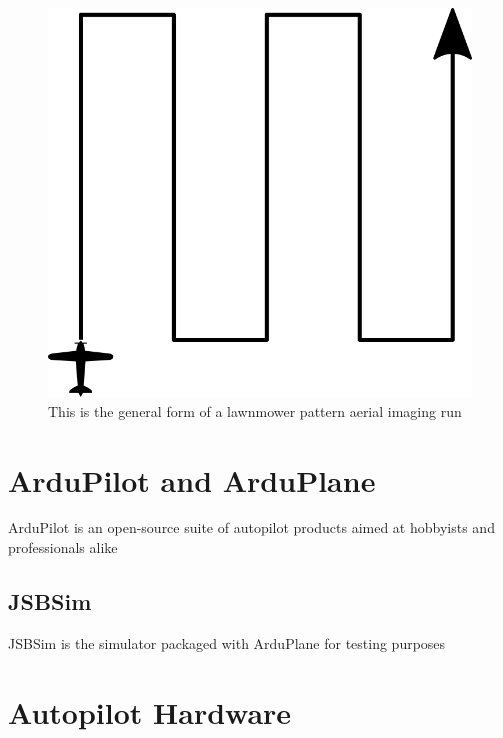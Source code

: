 \begin{figure}[htbp!] 
\centering    
\includegraphics[width=1.0\textwidth]{SimpleLawnmower}
\caption[Simple Lawnmower]{This is the general form of a lawnmower pattern aerial imaging run} %
\label{fig:simplelawnmower}
\end{figure}


\section{ArduPilot and ArduPlane} 
\label{intro:arduplane}

ArduPilot is an open-source suite of autopilot products aimed at hobbyists and professionals alike 

\subsection{JSBSim}
\label{intro:jsbsim}

JSBSim is the simulator packaged with ArduPlane for testing purposes

\section{Autopilot Hardware} 
\label{intro:hardware}



